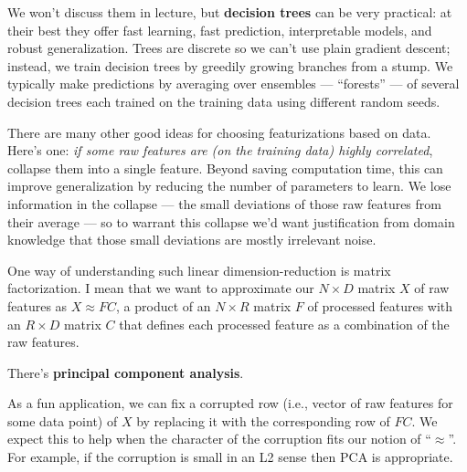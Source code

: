   We won't discuss them in lecture, but \textbf{decision trees} can be very
  practical: at their best they offer fast learning, fast prediction,
  interpretable models, and robust generalization.  Trees are discrete so we
  can't use plain gradient descent; instead, we train decision trees by
  greedily growing branches from a stump.  We typically make predictions by
  averaging over ensembles --- ``forests'' --- of several decision trees each
  trained on the training data using different random seeds.


  There are many other good ideas for choosing featurizations based on data.
  Here's one: \emph{if some raw features are (on the training data) highly
  correlated}, collapse them into a single feature.  Beyond saving computation
  time, this can improve generalization by reducing the number of parameters to
  learn.  We lose information in the collapse --- the small deviations of those
  raw features from their average --- so to warrant this collapse we'd want justification from domain knowledge
  that those small deviations are mostly irrelevant noise.


  One way of understanding such linear dimension-reduction is matrix
  factorization.  I mean that we want to approximate our $N\times D$ matrix $X$
  of raw features as $X \approx F C$, a product of an $N\times R$ matrix $F$ of
  processed features with an $R\times D$ matrix $C$ that defines each processed
  feature as a combination of the raw features.

  There's \textbf{principal component analysis}.

  As a fun application, we can fix a corrupted row (i.e., vector of raw
  features for some data point) of $X$ by replacing it with the corresponding
  row of $F C$.  We expect this to help when the character of the corruption
  fits our notion of ``$\approx$''.  For example, if the corruption is small
  in an L2 sense then PCA is appropriate.
